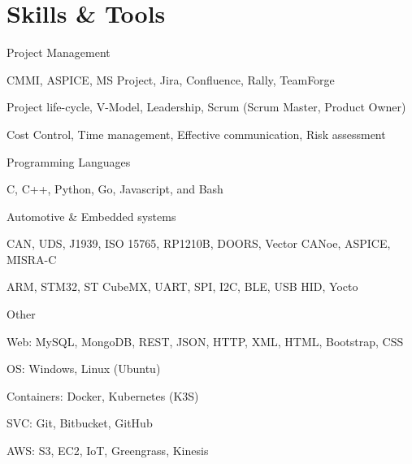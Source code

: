
\section{Skills & Tools}

\skillgroup
    {Project Management}
    {
        \begin{itemize-bullets}
            \item{CMMI, ASPICE, MS Project, Jira, Confluence, Rally, TeamForge}
            \item{Project life-cycle, V-Model, Leadership, Scrum (Scrum Master, Product Owner)}
            \item{Cost Control, Time management, Effective communication, Risk assessment}
        \end{itemize-bullets}
    }

\skillgroup
    {Programming Languages}
    {
        \begin{itemize-bullets}
            \item{C, C++, Python, Go, Javascript, and Bash}
        \end{itemize-bullets}
    }

\skillgroup
    {Automotive & Embedded systems}
    {
        \begin{itemize-bullets}
            \item{CAN, UDS, J1939, ISO 15765, RP1210B, DOORS, Vector CANoe, ASPICE, MISRA-C}
            \item{ARM, STM32, ST CubeMX, UART, SPI, I2C, BLE, USB HID, Yocto}
        \end{itemize-bullets}
    }

\skillgroup
    {Other}
    {
        \begin{itemize-bullets}
            \item{Web: MySQL, MongoDB, REST, JSON, HTTP, XML, HTML, Bootstrap, CSS}
            \item{OS: Windows, Linux (Ubuntu)}
            \item{Containers: Docker, Kubernetes (K3S)}
            \item{SVC: Git, Bitbucket, GitHub}
            \item{AWS: S3, EC2, IoT, Greengrass, Kinesis}
        \end{itemize-bullets}
    }
